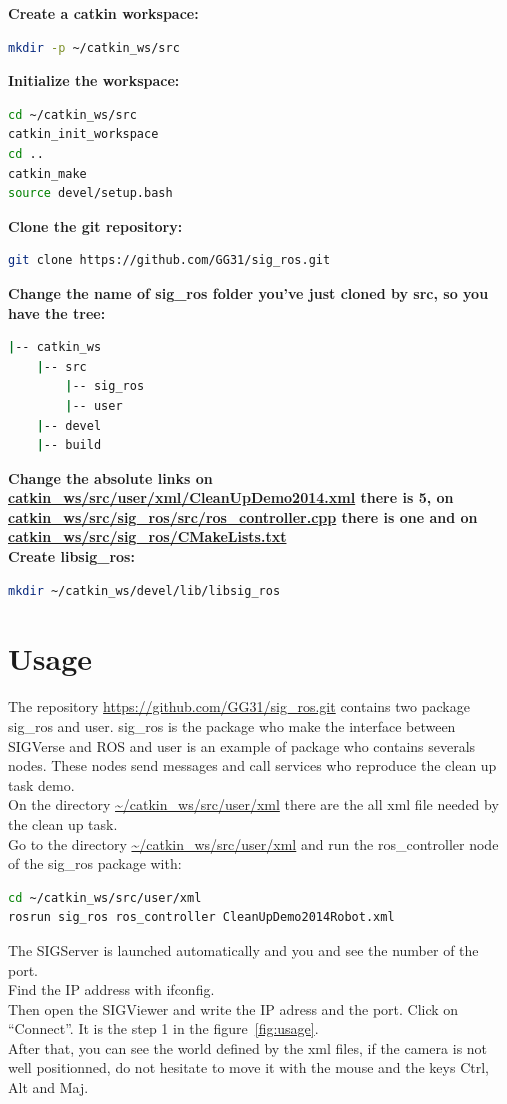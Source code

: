 \documentclass[notitlepage]{report}
\begin{document}
\noindent\textbf{Create a catkin workspace:} 
\begin{lstlisting}[language=bash]
mkdir -p ~/catkin_ws/src
\end{lstlisting}
\textbf{Initialize the workspace:} 
\begin{lstlisting}[language=bash]
cd ~/catkin_ws/src
catkin_init_workspace
cd ..
catkin_make
source devel/setup.bash
\end{lstlisting}
\textbf{Clone the git repository:}
\begin{lstlisting}[language=bash]
git clone https://github.com/GG31/sig_ros.git
\end{lstlisting}
\textbf{Change the name of sig\_ros folder you've just cloned by src, so you have the tree:}
\begin{lstlisting}[language=bash]
|-- catkin_ws
    |-- src
        |-- sig_ros
        |-- user
    |-- devel
    |-- build
\end{lstlisting}
\textbf{Change the absolute links on \url{catkin_ws/src/user/xml/CleanUpDemo2014.xml} there is 5, on \url{catkin_ws/src/sig_ros/src/ros_controller.cpp} there is one and on \url{catkin_ws/src/sig_ros/CMakeLists.txt}}\\
\textbf{Create libsig\_ros:} 
\begin{lstlisting}[language=bash]
mkdir ~/catkin_ws/devel/lib/libsig_ros
\end{lstlisting}

\chapter{Usage}
The repository \url{https://github.com/GG31/sig_ros.git} contains two package sig\_ros and user. sig\_ros is the package who make the interface between SIGVerse and ROS and user is an example of package who contains severals nodes. These nodes send messages and call services who reproduce the clean up task demo.\\
On the directory \url{~/catkin_ws/src/user/xml} there are the all xml file needed by the clean up task.\\

Go to the directory \url{~/catkin_ws/src/user/xml} and run the ros\_controller node of the sig\_ros package with:
\begin{lstlisting}[language=bash]
cd ~/catkin_ws/src/user/xml
rosrun sig_ros ros_controller CleanUpDemo2014Robot.xml
\end{lstlisting}
The SIGServer is launched automatically and you and see the number of the port.\\
Find the IP address with ifconfig.\\
Then open the SIGViewer and write the IP adress and the port. Click on ``Connect''. It is the step 1 in the figure~\ref{fig:usage}.\\
After that, you can see the world defined by the xml files, if the camera is not well positionned, do not hesitate to move it with the mouse and the keys Ctrl, Alt and Maj.\\
\end{document}
